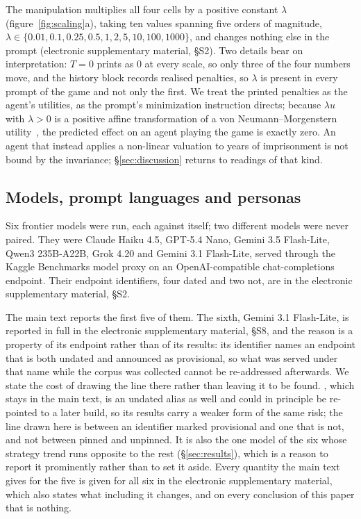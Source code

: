 \documentclass[11pt,a4paper]{article}
\newcommand{\lam}{\lambda}
\begin{document}
The manipulation multiplies all four cells by a positive constant $\lam$
(figure~\ref{fig:scaling}a), taking ten values spanning five orders of
magnitude, $\lam \in \{0.01, 0.1, 0.25, 0.5, 1, 2, 5, 10, 100, 1000\}$, and
changes nothing else in the prompt (electronic supplementary material, \S S2).
Two details bear on interpretation: $T = 0$ prints as 0 at every scale, so only
three of the four numbers move, and the history block records realised
penalties, so $\lam$ is present in every prompt of the game and not only the
first. We treat the printed penalties as the agent's utilities, as the prompt's
minimization instruction directs; because $\lam u$ with $\lam > 0$ is a positive
affine transformation of a von Neumann--Morgenstern
utility~\citep{vonneumann1944theory,luce1957games}, the predicted effect on an
agent playing the game is exactly zero. An agent that instead applies a
non-linear valuation to years of imprisonment is not bound by the invariance;
\S\ref{sec:discussion} returns to readings of that kind.

\subsection{Models, prompt languages and personas}

Six frontier models were run, each against itself; two different models were
never paired. They were Claude Haiku 4.5, GPT-5.4 Nano, Gemini 3.5 Flash-Lite,
Qwen3 235B-A22B, Grok 4.20 and Gemini 3.1 Flash-Lite, served through the Kaggle
Benchmarks model proxy on an OpenAI-compatible chat-completions endpoint. Their
endpoint identifiers, four dated and two not, are in the electronic
supplementary material, \S S2.

The main text reports the first five of them. The sixth, Gemini 3.1 Flash-Lite,
is reported in full in the electronic supplementary material, \S S8, and the
reason is a property of its endpoint rather than of its results: its identifier
names an endpoint that is both undated and announced as provisional, so what was
served under that name while the corpus was collected cannot be re-addressed
afterwards. We state the cost of drawing the line there rather than leaving it
to be found. , which stays in the main text, is an
undated alias as well and could in principle be re-pointed to a later build, so
its results carry a weaker form of the same risk; the line drawn here is between
an identifier marked provisional and one that is not, and not between pinned and
unpinned. It is also the one model of the six whose strategy trend
runs opposite to the rest (\S\ref{sec:results}), which is a reason to report it
prominently rather than to set it aside. Every quantity the main text gives for
the five is given for all six in the electronic supplementary material, which
also states what including it changes, and on every conclusion of this paper
that is nothing.
\end{document}
